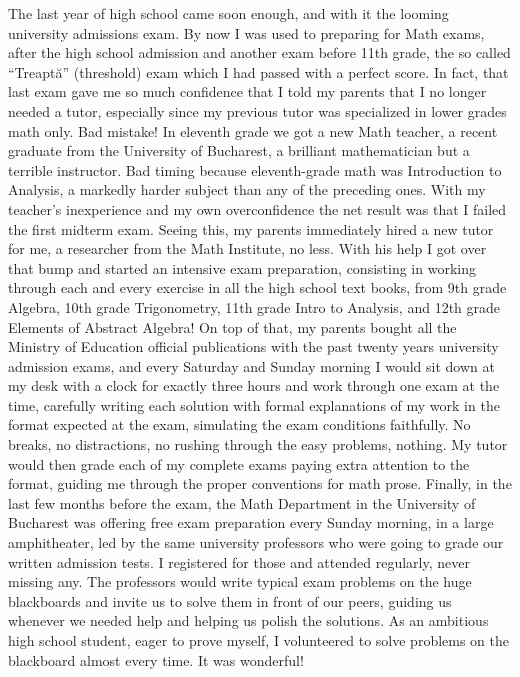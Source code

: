 \documentclass[12pt]{book}
\begin{document}
The last year of high school came soon enough, and with it the looming
university admissions exam. By now I was used to preparing for Math
exams, after the high school admission and another exam before 11th
grade, the so called ``Treaptă'' (threshold) exam which I had passed
with a perfect score. In fact, that last exam gave me so much confidence
that I told my parents that I no longer needed a tutor, especially since
my previous tutor was specialized in lower grades math only. Bad
mistake! In eleventh grade we got a new Math teacher, a recent graduate
from the University of Bucharest, a brilliant mathematician but a
terrible instructor. Bad timing because eleventh-grade math was
Introduction to Analysis, a markedly harder subject than any of the
preceding ones. With my teacher's inexperience and my own overconfidence
the net result was that I failed the first midterm exam. Seeing this, my
parents immediately hired a new tutor for me, a researcher from the Math
Institute, no less. With his help I got over that bump and started an
intensive exam preparation, consisting in working through each and every
exercise in all the high school text books, from 9th grade Algebra, 10th
grade Trigonometry, 11th grade Intro to Analysis, and 12th grade
Elements of Abstract Algebra! On top of that, my parents bought all the
Ministry of Education official publications with the past twenty years
university admission exams, and every Saturday and Sunday morning I
would sit down at my desk with a clock for exactly three hours and work
through one exam at the time, carefully writing each solution with
formal explanations of my work in the format expected at the exam,
simulating the exam conditions faithfully. No breaks, no distractions,
no rushing through the easy problems, nothing. My tutor would then grade
each of my complete exams paying extra attention to the format, guiding
me through the proper conventions for math prose. Finally, in the last
few months before the exam, the Math Department in the University of
Bucharest was offering free exam preparation every Sunday morning, in a
large amphitheater, led by the same university professors who were going
to grade our written admission tests. I registered for those and
attended regularly, never missing any. The professors would write
typical exam problems on the huge blackboards and invite us to solve
them in front of our peers, guiding us whenever we needed help and
helping us polish the solutions. As an ambitious high school student,
eager to prove myself, I volunteered to solve problems on the blackboard
almost every time. It was wonderful!
\end{document}
